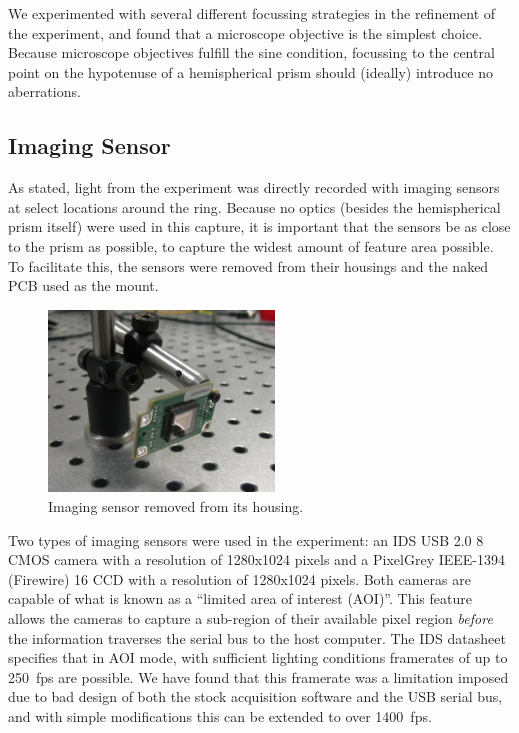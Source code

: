We experimented with several different focussing strategies in the
refinement of the experiment, and found that a microscope objective is the
simplest choice.  Because microscope objectives fulfill the sine condition,
focussing to the central point on the hypotenuse of a hemispherical prism
should (ideally) introduce no aberrations.

\subsection{Imaging Sensor}
As stated, light from the experiment was directly recorded with imaging
sensors at select locations around the ring.  Because no optics (besides
the hemispherical prism itself) were used in this capture, it is important
that the sensors be as close to the prism as possible, to capture the
widest amount of feature area possible.  To facilitate this, the sensors
were removed from their housings and the naked PCB used as the mount.
\begin{figure}[ht]
 \centering
 \includegraphics[width=6cm,keepaspectratio]{experimental/figures/nakedsensorcrop.jpg}
 \caption{Imaging sensor removed from its housing.}
 \label{fig:imagingsensor}
\end{figure}

Two types of imaging sensors were used in the experiment: an IDS USB 2.0
\SI{8}{\bit} CMOS camera with a resolution of 1280x1024 pixels and a PixelGrey
IEEE-1394 (Firewire) \SI{16}{\bit} CCD  with a resolution of 1280x1024 pixels.
Both cameras are capable of what is known as a ``limited area of interest
(AOI)''.  This feature allows the cameras to capture a sub-region of their
available pixel region \textit{before} the information traverses the serial
bus to the host computer.  The IDS datasheet specifies that in AOI mode,
with sufficient lighting conditions framerates of up to \SI{250}{fps} are
possible.  We have found that this framerate was a limitation imposed due
to bad design of both the stock acquisition software and the USB serial
bus, and with simple modifications this can be extended to over \SI{1400}{fps}.

